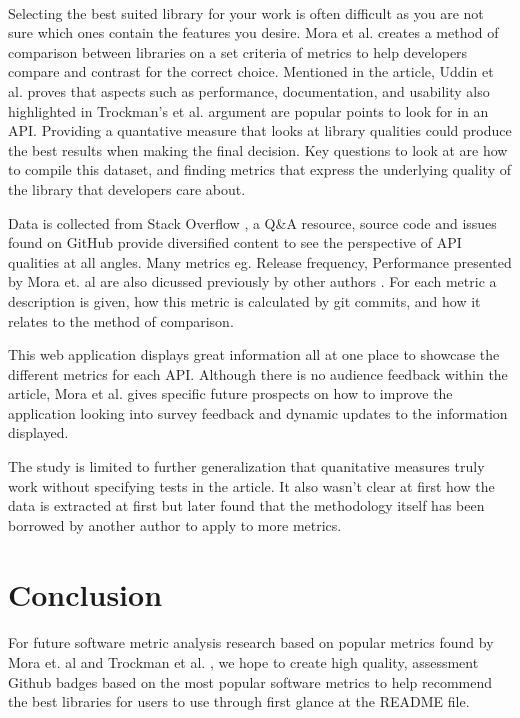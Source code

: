 \documentclass[12pt]{article}
\begin{document}
\paragraph{}
Selecting the best suited library for your work is often difficult as you are not sure which ones contain the features you desire.
Mora et al. \cite{metrics} creates a method of comparison between libraries on a set criteria of metrics to help developers
compare and contrast for the correct choice. Mentioned in the article, Uddin et al. \cite{analogical} proves that aspects
such as performance, documentation, and usability also highlighted in Trockman's et al. \cite{githubbadges} argument are
popular points to look for in an API.
Providing a quantative measure that looks at library qualities could produce the best results when making the final decision.
Key questions to look at are how to compile this dataset, and finding metrics that express the underlying quality of the library that developers care about.

Data is collected from Stack Overflow \cite{stackoverflow}, a Q\&A resource, source code and issues found on GitHub \cite{github} provide
diversified content to see the perspective of API qualities at all angles. Many metrics eg. Release frequency, Performance presented by Mora et. al \cite{metrics} are also
dicussed previously by other authors \cite{apiwave} \cite{analogical} \cite{githubbadges} \cite{opinerarticle}.
For each metric a description is given, how this metric is calculated by git commits, and how it relates to the method of comparison.

This web application displays great information all at one place to showcase the different metrics for each API. 
Although there is no audience feedback within the article, Mora et al. \cite{metrics} gives specific future prospects on how
to improve the application looking into survey feedback and dynamic updates to the information displayed. 

The study is limited to further generalization that quanitative measures truly work without specifying tests in the article. 
It also wasn't clear at first how the data is extracted at first but later found that the methodology itself has been borrowed by another author to apply to more metrics.  


\newpage 
\section{Conclusion}
\paragraph{}
For future software metric analysis research based on popular metrics found by Mora et. al \cite{metrics}
and Trockman et al. \cite{githubbadges}, we hope to create high quality, assessment Github \cite{github} badges
based on the most popular software metrics to help recommend the best libraries for users to use through first
glance at the README file.

\newpage


\end{document}
